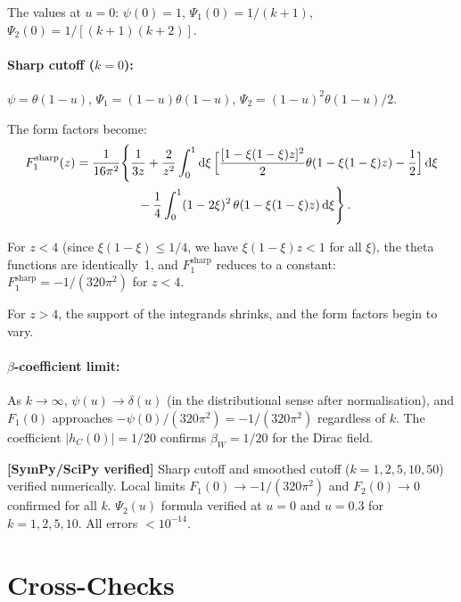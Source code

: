\documentclass[11pt,a4paper]{article}
\renewcommand{\dd}{\mathrm{d}}
\theoremstyle{definition}
\theoremstyle{remark}
\newcommand{\verified}[1]{%
  \par\noindent\colorbox{green!10}{%
    \parbox{\dimexpr\linewidth-2\fboxsep}{%
      \textcolor{green!50!black}{\textbf{[SymPy/SciPy verified]}}
      \textcolor{green!50!black}{#1}%
    }%
  }\par%
}
\begin{document}
The values at $u = 0$:
$\psi(0) = 1$, $\Psi_1(0) = 1/(k+1)$,
$\Psi_2(0) = 1/[(k+1)(k+2)]$.

\paragraph{Sharp cutoff ($k=0$):}
$\psi = \theta(1-u)$, $\Psi_1 = (1-u)\theta(1-u)$,
$\Psi_2 = (1-u)^2\theta(1-u)/2$.

The form factors become:
\begin{equation}
  \begin{aligned}
  F_1^{\text{sharp}}(z) &= \frac{1}{16\pi^2}\Biggl\{
  \frac{1}{3z}
  + \frac{2}{z^2}\int_0^1\dd\xi\,
  \Bigl[\frac{[1-\xi(1-\xi)z]^2}{2}\theta(1-\xi(1-\xi)z) - \frac{1}{2}\Bigr]
  \,\dd\xi\\
  &\qquad\qquad\quad
  - \frac{1}{4}\int_0^1(1-2\xi)^2\,
  \theta(1 - \xi(1-\xi)z)\,\dd\xi
  \Biggr\}\,.
  \end{aligned}
  \label{eq:F1-sharp}
\end{equation}

For $z < 4$ (since $\xi(1-\xi) \leq 1/4$, we have
$\xi(1-\xi)z < 1$ for all $\xi$), the theta functions are
identically~1, and $F_1^{\text{sharp}}$ reduces to a constant:
$F_1^{\text{sharp}} = -1/(320\pi^2)$ for $z < 4$.

For $z > 4$, the support of the integrands shrinks, and the
form factors begin to vary.

\paragraph{$\beta$-coefficient limit:}
As $k \to \infty$, $\psi(u) \to \delta(u)$ (in the distributional sense
after normalisation), and $F_1(0)$ approaches
$-\psi(0)/(320\pi^2) = -1/(320\pi^2)$ regardless of $k$.
The coefficient $|h_C(0)| = 1/20$ confirms
$\beta_W = 1/20$ for the Dirac field.

\verified{%
Sharp cutoff and smoothed cutoff ($k = 1, 2, 5, 10, 50$) verified
numerically.  Local limits $F_1(0) \to -1/(320\pi^2)$ and $F_2(0) \to 0$
confirmed for all $k$.  $\Psi_2(u)$ formula verified at $u = 0$ and
$u = 0.3$ for $k = 1, 2, 5, 10$.  All errors $< 10^{-14}$.}


\newpage
\section{Cross-Checks}
\label{sec:crosschecks}
\end{document}
